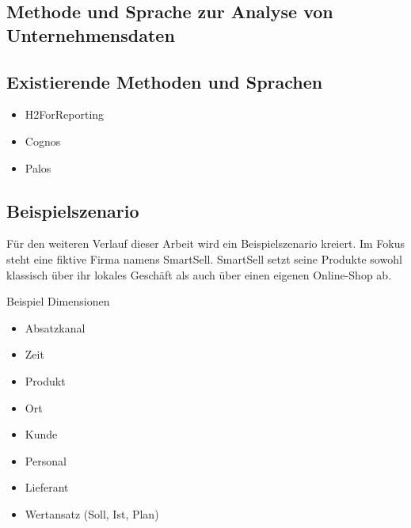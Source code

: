 \documentclass[
  language=german, %
  type=bachelor%
]{isthesis}
\begin{document}
\begin{content}
% 








  \chapter{Methode und Sprache zur Analyse von Unternehmensdaten}
  \section{Existierende Methoden und Sprachen}
  \begin{itemize}
    \item H2ForReporting
    \item Cognos
    \item Palos
  \end{itemize}

  \section{Beispielszenario}
  Für den weiteren Verlauf dieser Arbeit wird ein Beispielszenario kreiert. Im
  Fokus steht eine fiktive Firma namens SmartSell. SmartSell setzt seine
  Produkte sowohl klassisch über ihr lokales Geschäft als auch über einen
  eigenen Online-Shop ab.

  Beispiel Dimensionen
  \begin{itemize}
    \item Absatzkanal
    \item Zeit
    \item Produkt
    \item Ort
    \item Kunde
    \item Personal
    \item Lieferant
    \item Wertansatz (Soll, Ist, Plan)
  \end{itemize}


\end{content}
\end{document}
